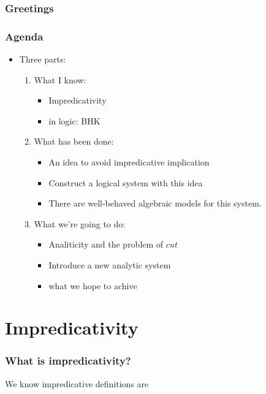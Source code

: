 \documentclass{paper}
\begin{document}
\setcounter{section}{-1}
\section{Greetings}
\section{Agenda}
\begin{itemize}
  \item Three parts:
    \begin{enumerate}
      \item What I know:
        \begin{itemize}
          \item Impredicativity
          \item in logic: BHK
        \end{itemize}
      \item What has been done:
        \begin{itemize}
          \item An idea to avoid impredicative implication
          \item Construct a logical system with this idea
          \item There are well-behaved algebraic models for this system.
        \end{itemize}
      \item What we're going to do:
        \begin{itemize}
          \item Analiticity and the problem of $cut$
          \item Introduce a new analytic system
          \item what we hope to achive
        \end{itemize}
    \end{enumerate}
\end{itemize}
\part{Impredicativity}
\section{What is impredicativity?}
\textbullet We know impredicative definitions are 
\end{document}
